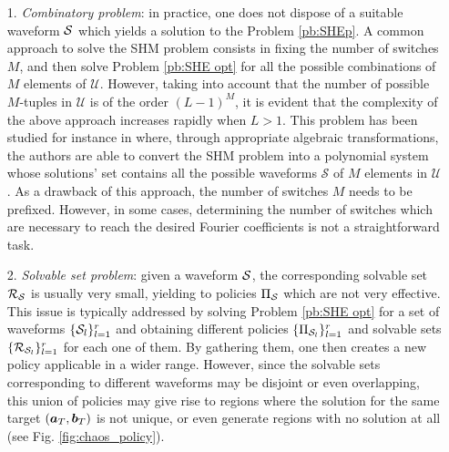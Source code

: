 \documentclass[twocolumn]{autart}    %
\begin{document}
\begin{itemize}
	\item[1.] \textit{Combinatory problem}: in practice, one does not dispose of a suitable waveform $\mathcal{S}$ which yields a solution to the Problem \ref{pb:SHEp}. A common approach to solve the SHM problem consists in fixing the number of switches $M$, and then solve Problem \ref{pb:SHE opt} for  all the possible combinations of $M$ elements of $\mathcal{U}$. However, taking into account that the number of possible $M$-tuples  in $\mathcal U$ is of the order $(L-1)^M$, it is evident that the complexity of the above approach increases rapidly when $L>1$. This problem has been studied for instance in \cite{Yang2015,Yang2017} where, through appropriate algebraic transformations, the authors are able to convert the SHM problem into a polynomial system whose solutions' set contains all the possible waveforms $\mathcal S$ of $M$ elements in $\mathcal{U}$. As a drawback of this approach, the number of switches $M$ needs to be prefixed. However, in some cases,  determining the number of switches which are necessary to reach the desired Fourier coefficients is not a straightforward task.
	
	\item[2.] \textit{Solvable set problem}: given a waveform $\mathcal{S}$, the corresponding solvable set $\mathcal{R}_{\mathcal{S}}$ is usually very small, yielding to policies $\Pi_{\mathcal{S}}$ which are not very effective. This issue is typically addressed by solving Problem \ref{pb:SHE opt} for a set of waveforms $\{\mathcal{S}_l\}_{l=1}^r$ and obtaining different policies $\{\Pi_{\mathcal{S}_l}\}_{l=1}^r$ and solvable sets $\{\mathcal{R}_{\mathcal{S}_l}\}_{l=1}^r$ for each one of them. By gathering them, one then creates a new policy applicable in a wider range. However, since the solvable sets corresponding to different waveforms may be disjoint or even overlapping, this union of policies may give rise to regions where the solution for the same target $(\bm{a}_T,\bm{b}_T)$ is not unique, or even generate regions with no solution at all (see Fig. \ref{fig:chaos_policy}).
	

\end{itemize}
\end{document}
